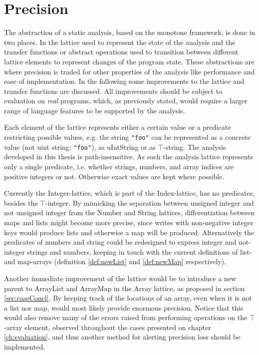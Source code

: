 \section{Precision}
\label{sec:future2}
The abstraction of a static analysis, based on the monotone framework, is done in two places. In the lattice used to represent the state of the analysis and the transfer functions or abstract operations used to transition between different lattice elements to represent changes of the program state. These abstractions are where precision is traded for other properties of the analysis like performance and ease of implementation. In the following some improvements to the lattice and transfer functions are discussed. All improvements should be subject to evaluation on \textit{real} programs, which, as previously stated, would require a larger range of language features to be supported by the analysis. 

Each element of the lattice represents either a certain value or a predicate restricting possible values, e.g. the string \texttt{"foo"} can be represented as a concrete value (not uint string: \texttt{"foo"}), as uIntString or as $\top$-string. The analysis developed in this thesis is path-insensitive. As such the analysis lattice represents only a single predicate, i.e. whether strings, numbers, and array indices are positive integers or not. Otherwise exact values are kept where possible. 

Currently the Integer-lattice, which is part of the Index-lattice, has no predicates, besides the $\top$-integer. By mimicking the separation between unsigned integer and not unsigned integer from the Number and String lattices, differentiation between maps and lists might become more precise, since writes with non-negative integer keys would produce lists and otherwise a map will be produced. Alternatively the predicates of numbers and string could be redesigned to express integer and not-integer strings and numbers, keeping in touch with the current definitions of list- and map-arrays (definition \ref{def:newList} and \ref{def:newMap} respectively). 

Another immediate improvement of the lattice would be to introduce a new parent to ArrayList and ArrayMap in the Array lattice, as proposed in section \ref{sec:caseConcl}. By keeping track of the locations of an array, even when it is not a list nor map, would most likely provide enormous precision. Notice that this would also remove many of the errors raised from performing operations on the $\top$-array element, observed throughout the cases presented on chapter \ref{ch:evaluation}, and thus another method for alerting precision loss should be implemented. 

